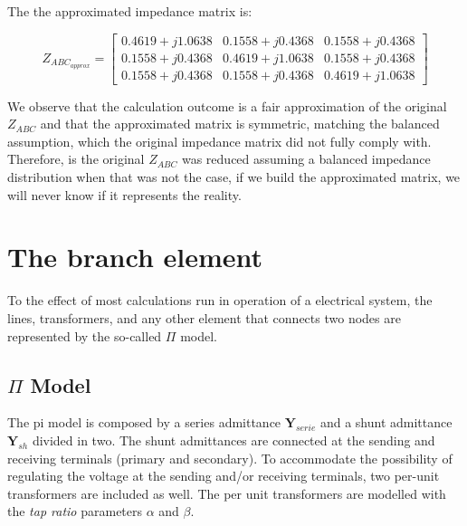 \documentclass[a4paper,twoside,fleqn]{tufte-book}
\begin{document}
The the approximated impedance matrix is:

$$
Z_{ABC_{approx}} = \left[ \begin{array}{ccc}
0.4619 + j1.0638 & 0.1558 + j0.4368 & 0.1558 + j0.4368 \\
0.1558 + j0.4368 & 0.4619 + j1.0638 & 0.1558 + j0.4368 \\ 
0.1558 + j0.4368 & 0.1558 + j0.4368 & 0.4619 + j1.0638
\end{array} \right]
$$

We observe that the calculation outcome is a fair approximation of the original $Z_{ABC}$ and that the approximated matrix is symmetric, matching the balanced assumption, which the original impedance matrix did not fully comply with. Therefore, is the original $Z_{ABC}$ was reduced assuming a balanced impedance distribution when that was not the case, if we build the approximated matrix, we will never know if it represents the reality.






\chapter{The branch element} 
\label{ch:branch}

To the effect of most calculations run in operation of a electrical system, the lines, transformers, and any other element that connects two nodes are represented by the so-called $\Pi$ model.


\section{$\Pi$ Model}


The pi model is composed by a series admittance  $\textbf{Y}_{serie}$ and a shunt admittance $\textbf{Y}_{sh}$ divided in two. The shunt admittances are connected at the sending and receiving terminals (primary and secondary). To accommodate the possibility of regulating the voltage at the sending and/or receiving terminals, two per-unit transformers are included as well. The per unit transformers are modelled with the \textit{tap ratio} parameters $\alpha$ and $\beta$.
\end{document}
